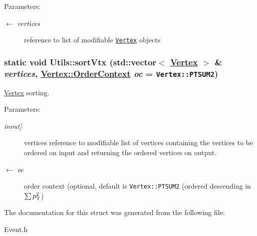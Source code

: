 \begin{Desc}
\item[Parameters:]
\begin{description}
\item[\mbox{$\leftarrow$} {\em vertices}]reference to list of modifiable {\tt \hyperlink{classVertex}{Vertex}} objects \end{description}
\end{Desc}
\hypertarget{structUtils_85ca39cbe948e63a71b0f18d3860c218}{
\subsubsection[sortVtx]{\setlength{\rightskip}{0pt plus 5cm}static void Utils::sort\-Vtx (std::vector$<$ \hyperlink{classVertex}{Vertex} $>$ \& {\em vertices}, \hyperlink{classVertex_40a06cc3fde98913c8259e3c11cd37ec}{Vertex::Order\-Context} {\em oc} = {\tt Vertex::PTSUM2})}}
\label{structUtils_85ca39cbe948e63a71b0f18d3860c218}


\hyperlink{classVertex}{Vertex} sorting. 

\begin{Desc}
\item[Parameters:]
\begin{description}
\item[{\em inout\mbox{]}}]vertices reference to modifiable list of vertices containing the vertices to be ordered on input and returning the ordered vertices on output. \item[\mbox{$\leftarrow$} {\em oc}]order context (optional, default is {\tt Vertex::PTSUM2} (ordered descending in $\sum{p_{\rm T}^{2}}$) \end{description}
\end{Desc}


The documentation for this struct was generated from the following file:\begin{CompactItemize}
\item 
Event.h\end{CompactItemize}
